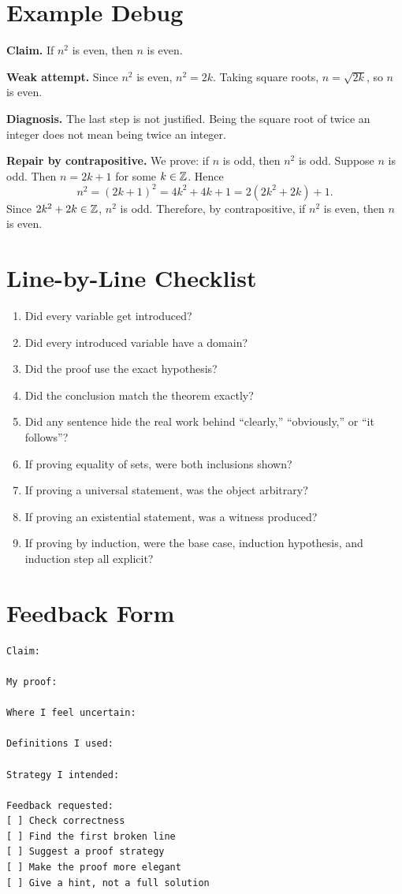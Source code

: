 \documentclass[11pt]{article}
\begin{document}
\section{Example Debug}

\textbf{Claim.} If $n^2$ is even, then $n$ is even.

\textbf{Weak attempt.} Since $n^2$ is even, $n^2=2k$. Taking square roots, $n=\sqrt{2k}$, so $n$ is even.

\textbf{Diagnosis.} The last step is not justified. Being the square root of twice an integer does not mean being twice an integer.

\textbf{Repair by contrapositive.} We prove: if $n$ is odd, then $n^2$ is odd. Suppose $n$ is odd. Then $n=2k+1$ for some $k\in\mathbb{Z}$. Hence
\[
n^2=(2k+1)^2=4k^2+4k+1=2(2k^2+2k)+1.
\]
Since $2k^2+2k\in\mathbb{Z}$, $n^2$ is odd. Therefore, by contrapositive, if $n^2$ is even, then $n$ is even.

\section{Line-by-Line Checklist}

\begin{enumerate}
\item Did every variable get introduced?
\item Did every introduced variable have a domain?
\item Did the proof use the exact hypothesis?
\item Did the conclusion match the theorem exactly?
\item Did any sentence hide the real work behind ``clearly,'' ``obviously,'' or ``it follows''?
\item If proving equality of sets, were both inclusions shown?
\item If proving a universal statement, was the object arbitrary?
\item If proving an existential statement, was a witness produced?
\item If proving by induction, were the base case, induction hypothesis, and induction step all explicit?
\end{enumerate}

\section{Feedback Form}

\begin{verbatim}
Claim:

My proof:

Where I feel uncertain:

Definitions I used:

Strategy I intended:

Feedback requested:
[ ] Check correctness
[ ] Find the first broken line
[ ] Suggest a proof strategy
[ ] Make the proof more elegant
[ ] Give a hint, not a full solution
\end{verbatim}
\end{document}
